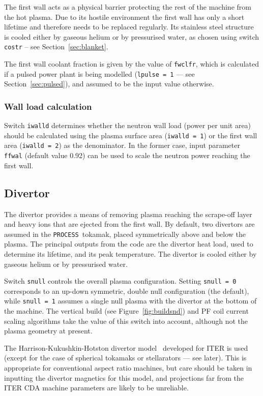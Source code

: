 \documentclass[11pt,a4paper]{report}
\newcommand{\process}{\mbox{\texttt{PROCESS}}}
\begin{document}
The first wall acts as a physical barrier protecting the rest of the machine
from the hot plasma. Due to its hostile environment the first wall has only a
short lifetime and therefore needs to be replaced regularly. Its stainless
steel structure is cooled either by gaseous helium or by pressurised water, as
chosen using switch \texttt{costr} -- see Section~\ref{sec:blanket}.

The first wall coolant fraction is given by the value of \texttt{fwclfr},
which is calculated if a pulsed power plant is being modelled (\texttt{lpulse
  = 1} --- see Section~\ref{sec:pulsed}), and assumed to be the input value
otherwise.

\subsubsection*{Wall load calculation}

Switch \texttt{iwalld} determines whether the neutron wall load (power per
unit area) should be calculated using the plasma surface area (\texttt{iwalld
  = 1}) or the first wall area (\texttt{iwalld = 2}) as the denominator. In
the former case, input parameter \texttt{ffwal} (default value 0.92)
can be used to scale the neutron power reaching the first wall.

\subsection{Divertor}
\label{sec:divertor}

The divertor provides a means of removing plasma reaching the scrape-off layer
and heavy ions that are ejected from the first wall.  By default, two
divertors are assumed in the \process\ tokamak, placed symmetrically above
and below the plasma. The principal outputs from the code are the divertor
heat load, used to determine its lifetime, and its peak temperature. The
divertor is cooled either by gaseous helium or by pressurised water.

Switch \texttt{snull} controls the overall plasma configuration. Setting
\texttt{snull = 0} corresponds to an up-down symmetric, double null
configuration (the default), while \texttt{snull = 1} assumes a single null
plasma with the divertor at the bottom of the machine. The vertical build (see
Figure~\ref{fig:buildsnd}) and PF coil current scaling algorithms take the
value of this switch into account, although not the plasma geometry at
present.

The Harrison-Kukushkin-Hotston divertor model~\cite{IPDG} developed for ITER
is used (except for the case of spherical tokamaks or stellarators --- see
later). This is appropriate for conventional aspect ratio machines, but care
should be taken in inputting the divertor magnetics for this model, and
projections far from the ITER CDA machine parameters are likely to be
unreliable.
\end{document}
